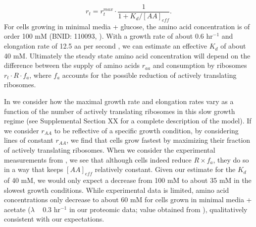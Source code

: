 \begin{equation}
r_t = r_t^{max} \cdot \frac{1}{1 + K_d / [AA]_{eff}}.
\label{eq:rate_Kd}
\end{equation}
For cells growing in minimal media + glucose, the amino acid concentration is of
order 100 mM  (BNID: 110093, \citep{milo2010, bennett2009}). With a growth rate
of about 0.6 hr$^{-1}$ and elongation rate of 12.5 aa per second
\citep{dai2016}, we can estimate an effective $K_d$ of about 40 mM. Ultimately
the steady state amino acid concentration will depend on the difference between
the supply of amino acids $r_{aa}$ and consumption by ribosomes $r_t \cdot R
\cdot f_a$, where $f_a$ accounts for the possible reduction of actively
translating ribosomes.

In  we consider how the maximal growth rate and
elongation rates vary as a function of the number of actively translating
ribosomes in this slow growth regime (see Supplemental Section XX for a complete
description of the model). If we consider $r_{AA}$ to be reflective of a specific
growth condition, by considering lines of constant $r_{AA}$, we find that cells
grow fastest by maximizing their fraction of actively translating ribosomes.
When we consider the experimental measurements from \cite{dai2018}, we see
that although cells indeed reduce $R \times f_a$, they do so in a way that keeps
$[AA]_{eff}$ relatively constant. Given our estimate for the $K_d$ of 40 mM,  we
would only expect a decrease from 100 mM to about 35 mM in the slowest growth
conditions. While experimental data is limited, amino acid concentrations only
decrease to about 60 mM for cells grown in minimal media + acetate ($\lambda$ ~
0.3 hr$^{-1}$ in our proteomic data; value obtained from \cite{bennett2009}), qualitatively consistent with our expectations.

